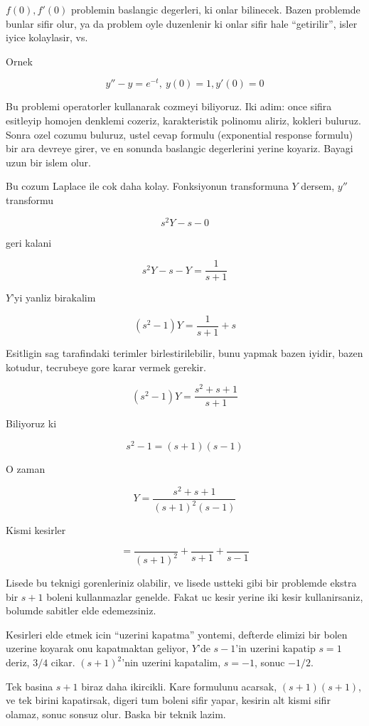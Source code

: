 \documentclass[12pt,fleqn]{article}
\begin{document}
$f(0),f'(0)$ problemin baslangic degerleri, ki onlar bilinecek. Bazen
problemde bunlar sifir olur, ya da problem oyle duzenlenir ki onlar sifir
hale ``getirilir'', isler iyice kolaylasir, vs.

Ornek

\[ y'' - y = e^{-t}, \ y(0) = 1, y'(0)=0 \]

Bu problemi operatorler kullanarak cozmeyi biliyoruz. Iki adim: once sifira
esitleyip homojen denklemi cozeriz, karakteristik polinomu aliriz, kokleri
buluruz. Sonra ozel cozumu buluruz, ustel cevap formulu (exponential
response formulu) bir ara devreye girer, ve en sonunda baslangic
degerlerini yerine koyariz. Bayagi uzun bir islem olur. 

Bu cozum Laplace ile cok daha kolay. Fonksiyonun transformuna $Y$ dersem,
$y''$ transformu

\[ s^2Y - s - 0\]

geri kalani

\[ s^2Y - s - Y = \frac{1}{s+1}\]

$Y$'yi yanliz birakalim

\[ (s^2-1)Y = \frac{1}{s+1} + s \]

Esitligin sag tarafindaki terimler birlestirilebilir, bunu yapmak bazen
iyidir, bazen kotudur, tecrubeye gore karar vermek gerekir. 

\[ (s^2-1)Y = \frac{s^2+s+1}{s+1} \]

Biliyoruz ki

\[ s^2-1 = (s+1)(s-1) \]

O zaman 

\[ Y = \frac{s^2+s+1}{(s+1)^2(s-1)} \]


Kismi kesirler 

\[ = \frac{}{(s+1)^2} + \frac{}{s+1} + \frac{}{s-1} \]


Lisede bu teknigi gorenleriniz olabilir, ve lisede ustteki gibi bir
problemde ekstra bir $s+1$ boleni kullanmazlar genelde. Fakat uc kesir
yerine iki kesir kullanirsaniz, bolumde sabitler elde edemezsiniz. 

Kesirleri elde etmek icin ``uzerini kapatma'' yontemi, defterde elimizi bir
bolen uzerine koyarak onu kapatmaktan geliyor, $Y$'de  $s-1$'in
uzerini kapatip $s=1$ deriz, $3/4$ cikar. $(s+1)^2$'nin uzerini kapatalim,
$s=-1$, sonuc $-1/2$. 

Tek basina $s+1$ biraz daha ikircikli. Kare formulunu acarsak,
$(s+1)(s+1)$, ve tek birini kapatirsak, digeri tum boleni sifir yapar,
kesirin alt kismi sifir olamaz, sonuc sonsuz olur. Baska bir teknik lazim. 
\end{document}
